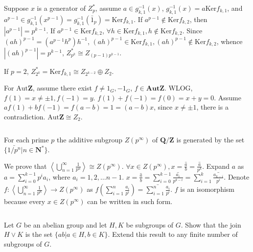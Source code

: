 \begin{answer}
    Suppose $x$ is a generator of $Z_{p}^{*}$, assume $a\in g_{k,1}^{-1}(x)$, $g_{k,1}^{-1}(x)=a\mathrm{Ker}f_{k,1}$, and $a^{p-1}\in g_{k,1}^{-1}(x^{p-1})=g_{k,1}^{-1}(\bar{1}_{p})=\mathrm{Ker}f_{k,1}$. If $a^{p-1}\notin \mathrm{Ker}f_{k,2}$, then $\left| a^{p-1} \right| =p^{k-1}$. If $a^{p-1}\in \mathrm{Ker}f_{k,2}$, $\forall h\in \mathrm{Ker}f_{k,1},h \notin\mathrm{Ker}f_{k,2}$. Since $(ah)^{p-1}=(a^{p-1}h^{p})h^{-1}$, $(ah)^{p-1}\in \mathrm{Ker}f_{k,1}, (ah)^{p-1}\notin \mathrm{Ker}f_{k,2}$, whence $\left| (ah)^{p-1} \right|=p^{k-1} $, $Z_{p^{k}}^{*}\cong Z_{(p-1)p^{k-1}}$.

    If $p=2$, $Z_{2^{k}}^{*}=\mathrm{Ker}f_{k,1}\cong Z_{2^{k-2}}\oplus Z_{2}$.

    For $\mathrm{Aut}\mathbf{Z}$, assume there exist $f\neq 1_{G}, -1_{G}$, $f\in \mathbf{Aut}\mathbf{Z}$. WLOG, $f(1)=x\neq \pm 1, f(-1)=y$. $f(1)+f(-1)=f(0)=x+y=0$. Assume $af(1)+bf(-1)=f(a-b)=1=(a-b)x$, since $x\neq \pm 1$, there is a contradiction. $\mathrm{Aut}\mathbf{Z}\cong Z_{2}$.
\end{answer}

$$ $$

\begin{ex}
    For each prime $p$ the additive subgroup $Z(p^\infty)$ of $\mathbf{Q}/\mathbf{Z}$ is generated by the set $\{\bar{1/p^n}|n\in \mathbf{N^*}\}$.
\end{ex}

\begin{answer}
    We prove that $\left\langle\bigcup\limits_{n=1}^{\infty}\frac{1}{p^{n}}\right\rangle\cong Z(p^{\infty})$. $\forall x\in Z(p^{\infty}), x=\bar{\frac{a}{b}}=\bar{\frac{a}{p^{k}}}$. Expand $a$ as $a=\sum\limits_{i=0}^{k-1}p^{i}a_{i}$, where $a_{i}=1,2,\dots n-1$. $x=\bar{\frac{a}{b}}=\sum\limits_{i=0}^{k-1}\bar{\frac{a_{i}}{p^{k-i}}}=\sum\limits_{i=1}^{k}\bar{\frac{a_{k-i}}{p^{i}}}$. Denote $f: \left\langle\bigcup\limits_{n=1}^{\infty}\frac{1}{p^{n}}\right\rangle\to Z(p^{\infty})$ as $f(\sum\limits_{i=1}^{n}\frac{a_{i}}{p^{i}})=\bar{\sum\limits_{i=1}^{n}\frac{a_{i}}{p^{i}}}$. $f$ is an isomorphism because every $x\in Z(p^{\infty})$ can be written in such form.
\end{answer}

$$ $$

\begin{ex}
    Let $G$ be an abelian group and let $H, K$ be subgroups of $G$. Show that the join $H\vee K$ is the set $\{ab|a\in H, b\in K\}$. Extend this result to any finite number of subgroups of $G$.
\end{ex}

